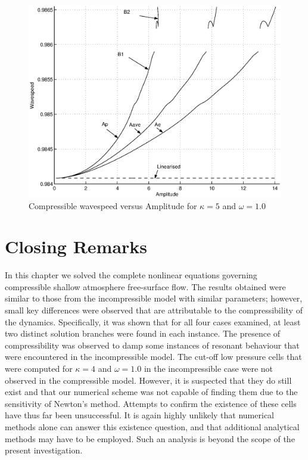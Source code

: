 \begin{figure}[htbp]
	\centering
		\includegraphics[scale=0.75]{IMAGES/CvsAk5w1com.eps}
	\caption{Compressible wavespeed versus Amplitude for $\kappa=5$ and $\omega=1.0$}
	\label{fig:CvsAk5w1com}
\end{figure}

\section{Closing Remarks}
In this chapter we solved the complete nonlinear equations governing compressible shallow atmosphere free-surface flow. The results obtained were similar to those from the incompressible model with similar parameters; however, small key differences were observed that are attributable to the compressibility of the dynamics. Specifically, it was shown that for all four cases examined, at least two distinct solution branches were found in each instance. The presence of compressibility was observed to damp some instances of resonant behaviour that were encountered in the incompressible model. The cut-off low pressure cells that were computed for $\kappa=4$ and $\omega=1.0$ in the incompressible case were not observed in the compressible model. However, it is suspected that they do still exist and that our numerical scheme was not capable of finding them due to the sensitivity of Newton's method. Attempts to confirm the existence of these cells have thus far been unsuccessful. It is again highly unlikely that numerical methods alone can answer this existence question, and that additional analytical methods may have to be employed. Such an analysis is beyond the scope of the present investigation.
